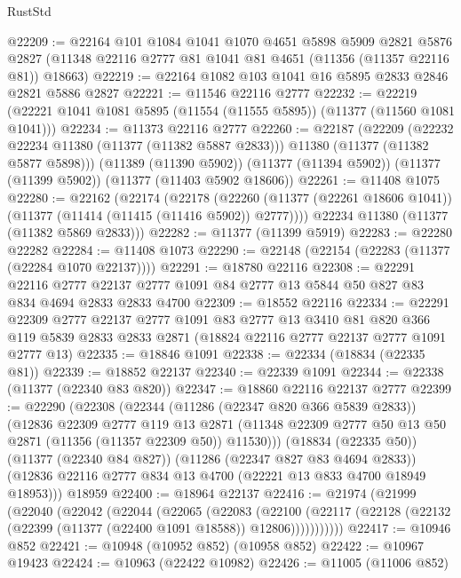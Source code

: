 \begin{lexlean}{RustStd}
\begin{coremodule}
@22209 := @22164
    @101
    @1084
    @1041
    @1070
    @4651
    @5898
    @5909
    @2821
    @5876
    @2827
    (@11348 @22116 @2777 @81 @1041 @81 @4651 (@11356 (@11357 @22116 @81)) @18663)
@22219 := @22164 @1082 @103 @1041 @16 @5895 @2833 @2846 @2821 @5886 @2827
@22221 := @11546 @22116 @2777
@22232 := @22219 (@22221 @1041 @1081 @5895 (@11554 (@11555 @5895)) (@11377 (@11560 @1081 @1041)))
@22234 := @11373 @22116 @2777
@22260 := @22187
    (@22209
      (@22232 @22234 @11380 (@11377 (@11382 @5887 @2833)))
      @11380
      (@11377 (@11382 @5877 @5898)))
    (@11389 (@11390 @5902))
    (@11377 (@11394 @5902))
    (@11377 (@11399 @5902))
    (@11377 (@11403 @5902 @18606))
@22261 := @11408 @1075
@22280 := @22162
    (@22174
      (@22178
        (@22260 (@11377 (@22261 @18606 @1041)) (@11377 (@11414 (@11415 (@11416 @5902)) @2777))))
      @22234
      @11380
      (@11377 (@11382 @5869 @2833)))
@22282 := @11377 (@11399 @5919)
@22283 := @22280 @22282
@22284 := @11408 @1073
@22290 := @22148 (@22154 (@22283 (@11377 (@22284 @1070 @22137))))
@22291 := @18780 @22116
@22308 := @22291
    @22116
    @2777
    @22137
    @2777
    @1091
    @84
    @2777
    @13
    @5844
    @50
    @827
    @83
    @834
    @4694
    @2833
    @2833
    @4700
@22309 := @18552 @22116
@22334 := @22291
    @22309
    @2777
    @22137
    @2777
    @1091
    @83
    @2777
    @13
    @3410
    @81
    @820
    @366
    @119
    @5839
    @2833
    @2833
    @2871
    (@18824 @22116 @2777 @22137 @2777 @1091 @2777 @13)
@22335 := @18846 @1091
@22338 := @22334 (@18834 (@22335 @81))
@22339 := @18852 @22137
@22340 := @22339 @1091
@22344 := @22338 (@11377 (@22340 @83 @820))
@22347 := @18860 @22116 @22137 @2777
@22399 := @22290
    (@22308
      (@22344
        (@11286 (@22347 @820 @366 @5839 @2833))
        (@12836
          @22309
          @2777
          @119
          @13
          @2871
          (@11348 @22309 @2777 @50 @13 @50 @2871 (@11356 (@11357 @22309 @50)) @11530)))
      (@18834 (@22335 @50))
      (@11377 (@22340 @84 @827))
      (@11286 (@22347 @827 @83 @4694 @2833))
      (@12836 @22116 @2777 @834 @13 @4700 (@22221 @13 @833 @4700 @18949 @18953)))
    @18959
@22400 := @18964 @22137
@22416 := @21974
    (@21999
      (@22040
        (@22042
          (@22044
            (@22065
              (@22083
                (@22100
                  (@22117 (@22128 (@22132 (@22399 (@11377 (@22400 @1091 @18588)) @12806)))))))))))
@22417 := @10946 @852
@22421 := @10948 (@10952 @852) (@10958 @852)
@22422 := @10967 @19423
@22424 := @10963 (@22422 @10982)
@22426 := @11005 (@11006 @852)

\end{coremodule}
\end{lexlean}
